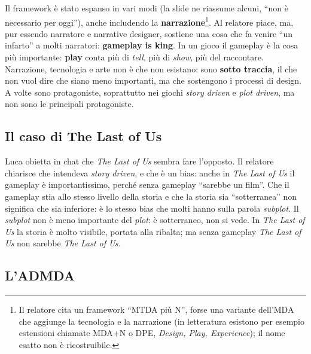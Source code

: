 Il framework è stato espanso in vari modi (la slide ne riassume alcuni, ``non
è necessario per oggi''), anche includendo la \textbf{narrazione}\footnote{Il
relatore cita un framework ``MTDA più N'', forse una variante dell'MDA che
aggiunge la tecnologia e la narrazione (in letteratura esistono per esempio
estensioni chiamate MDA+N o DPE, \emph{Design, Play, Experience}); il nome
esatto non è ricostruibile.}. Al relatore piace, ma, pur essendo narratore e
narrative designer, sostiene una cosa che fa venire ``un infarto'' a molti
narratori: \textbf{gameplay is king}. In un gioco il gameplay è la cosa più
importante: \textbf{play} conta più di \emph{tell}, più di \emph{show}, più del
raccontare. Narrazione, tecnologia e arte non è che non esistano: sono
\textbf{sotto traccia}, il che non vuol dire che siano meno importanti, ma che
sostengono i processi di design. A volte sono protagoniste, soprattutto nei
giochi \emph{story driven} e \emph{plot driven}, ma non sono le principali
protagoniste.

\subsection{Il caso di The Last of Us}

Luca obietta in chat che \emph{The Last of Us} sembra fare l'opposto. Il
relatore chiarisce che intendeva \emph{story driven}, e che è un bias: anche in
\emph{The Last of Us} il gameplay è importantissimo, perché senza gameplay
``sarebbe un film''. Che il gameplay stia allo stesso livello della storia e che
la storia sia ``sotterranea'' non significa che sia inferiore: è lo stesso bias
che molti hanno sulla parola \emph{subplot}. Il \emph{subplot} non è meno
importante del \emph{plot}: è sotterraneo, non si vede. In \emph{The Last of Us}
la storia è molto visibile, portata alla ribalta; ma senza gameplay \emph{The
Last of Us} non sarebbe \emph{The Last of Us}.

\subsection{L'ADMDA}
\label{subsec:z6-admda}


